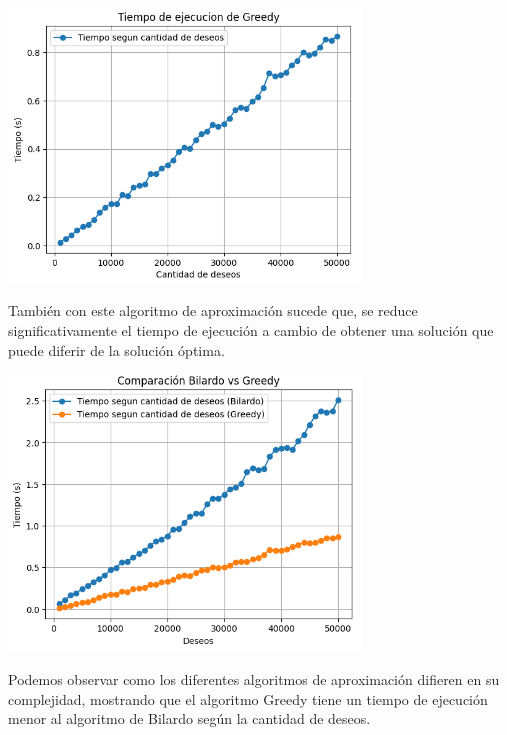 \documentclass{estilo}
\begin{document}
\begin{center}
\includegraphics[width=0.7\textwidth]{img/tiempo_greedy.png}

También con este algoritmo de aproximación sucede que, se reduce significativamente el tiempo de ejecución a cambio de obtener una solución que puede diferir de la solución óptima.
\end{center}

\begin{center}
\includegraphics[width=0.7\textwidth]{img/bilardo_vs_greedy_1.png}

Podemos observar como los diferentes algoritmos de aproximación difieren en su complejidad, mostrando que el algoritmo Greedy tiene un tiempo de ejecución menor al algoritmo de Bilardo según la cantidad de deseos.
\end{center}
\end{document}
